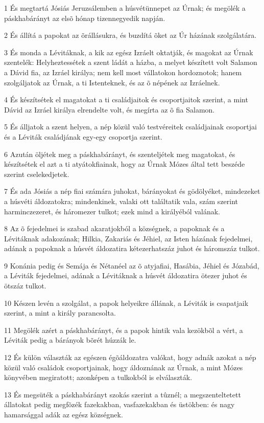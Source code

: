 \par 1 És megtartá Jósiás Jeruzsálemben a húsvétünnepet az Úrnak; és megölék a páskhabárányt az elsõ hónap tizennegyedik napján.
\par 2 És állítá a papokat az õrállásukra, és buzdítá õket az Úr házának szolgálatára.
\par 3 És monda a Lévitáknak, a kik az egész Izráelt oktatják, és magokat az Úrnak szentelék: Helyheztessétek a szent ládát a házba, a melyet készített volt Salamon a Dávid fia, az Izráel királya; nem kell most vállatokon hordoznotok; hanem szolgáljatok az Úrnak, a ti Istenteknek, és az õ népének az Izráelnek.
\par 4 És készítsétek el magatokat a ti családjaitok és csoportjaitok szerint, a mint Dávid az Izráel királya elrendelte volt, és megírta az õ fia Salamon.
\par 5 És álljatok a szent helyen, a nép közül való testvéreitek családjainak csoportjai és a Léviták családjának egy-egy csoportja szerint.
\par 6 Azután öljétek meg a páskhabárányt, és szenteljétek meg magatokat, és készítsétek el azt a ti atyátokfiainak, hogy az Úrnak Mózes által tett beszéde szerint cselekedjetek.
\par 7 És ada Jósiás a nép fiai számára juhokat, bárányokat és gödölyéket, mindezeket a húsvéti áldozatokra; mindenkinek, valaki ott találtatik vala, szám szerint harminczezeret, és háromezer tulkot; ezek mind a királyéból valának.
\par 8 Az õ fejedelmei is szabad akaratjokból a községnek, a papoknak és a Lévitáknak adakozának; Hilkia, Zakariás és Jéhiel, az Isten házának fejedelmei, adának a papoknak a húsvét áldozatira kétezerhatszáz juhot és háromszáz tulkot.
\par 9 Konánia pedig és Semája és Nétanéel az õ atyjafiai, Hasábia, Jéhiel és Józabád, a Léviták fejedelmei, adának a Lévitáknak a húsvét áldozatira ötezer juhot és ötszáz tulkot.
\par 10 Készen levén a szolgálat, a papok helyeikre állának, a Léviták is csapatjaik szerint, a mint a király parancsolta.
\par 11 Megölék azért a páskhabárányt, és a papok hintik vala kezökbõl a vért, a Léviták pedig a bárányok bõrét húzzák le.
\par 12 És külön választák az egészen égõáldozatra valókat, hogy adnák azokat a nép közül való családok csoportjainak, hogy áldoznának az Úrnak, a mint Mózes könyvében megiratott; azonképen a tulkokból is elválaszták.
\par 13 És megsüték a páskhabárányt szokás szerint a tûznél; a megszenteltetett állatokat pedig megfõzék fazekakban, vasfazekakban és üstökben: és nagy hamarsággal adák az egész községnek.
